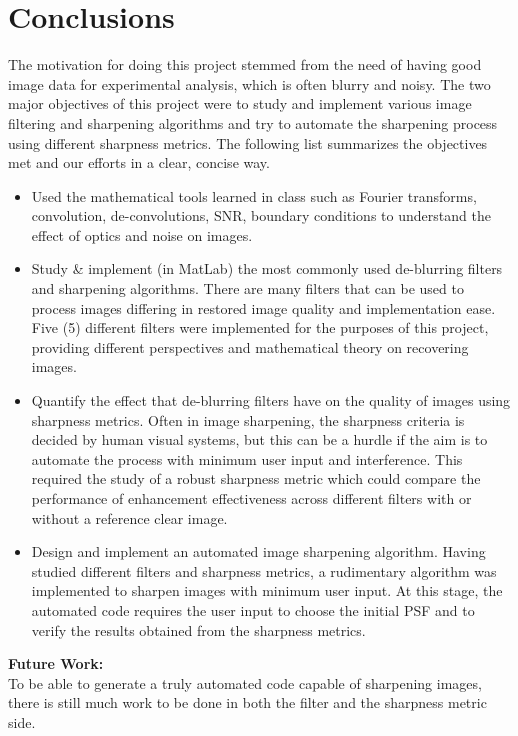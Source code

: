 
\section{Conclusions}
The motivation for doing this project stemmed from the need of having good image data for experimental analysis, which is often blurry and noisy. The two major objectives of this project were to study and implement various image filtering and sharpening algorithms and try to automate the sharpening process using different sharpness metrics. The following list summarizes the objectives met and our efforts in a clear, concise way.

\begin{itemize}
\item Used the mathematical tools learned in class such as Fourier transforms, convolution, de-convolutions, SNR, boundary conditions to understand the effect of optics and noise on images.
\item Study \& implement (in MatLab) the most commonly used de-blurring filters and sharpening algorithms. There are many filters that can be used to process images differing in restored image quality and implementation ease. Five (5) different filters were implemented for the purposes of this project, providing different perspectives and mathematical theory on recovering images.
\item Quantify the effect that de-blurring filters have on the quality of images using sharpness metrics. Often in image sharpening, the sharpness criteria is decided by human visual systems, but this can be a hurdle if the aim is to automate the process with minimum user input and interference. This required the study of a robust sharpness metric which could compare the performance of enhancement effectiveness across different filters with or without a reference clear image.
\item Design and implement an automated image sharpening algorithm. Having studied different filters and sharpness metrics, a rudimentary algorithm was implemented to sharpen images with minimum user input. At this stage, the automated code requires the user input to choose the initial PSF and to verify the results obtained from the sharpness metrics. 
\end{itemize}

{\bf Future Work:} \\
To be able to generate a truly automated code capable of sharpening images, there is still much work to be done in both the filter and the sharpness metric side.

